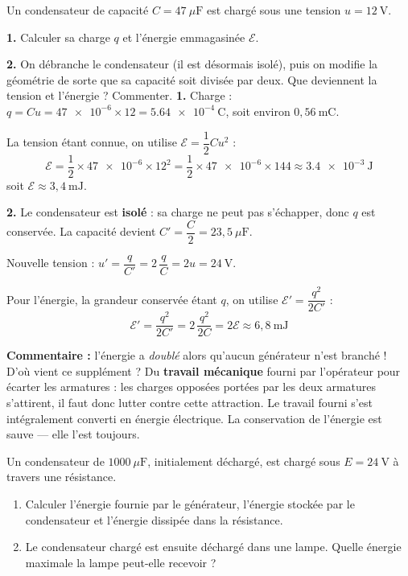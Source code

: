 \documentclass[11pt]{article}
\begin{document}
\begin{exoresolu}
Un condensateur de capacité $C = 47\ \mu\mathrm{F}$ est chargé sous une tension $u = 12\ \mathrm{V}$.

\textbf{1.} Calculer sa charge $q$ et l'énergie emmagasinée $\mathcal{E}$.

\textbf{2.} On débranche le condensateur (il est désormais isolé), puis on modifie la géométrie de sorte que sa capacité soit divisée par deux. Que deviennent la tension et l'énergie ? Commenter.
\tcblower
\textbf{1.} Charge : $q = Cu = \num{47e-6} \times 12 = \num{5,64e-4}\ \mathrm{C}$, soit environ $0{,}56\ \mathrm{mC}$.

La tension étant connue, on utilise $\mathcal{E} = \dfrac{1}{2}Cu^2$ :
\[ \mathcal{E} = \frac{1}{2} \times \num{47e-6} \times 12^2 = \frac{1}{2} \times \num{47e-6} \times 144 \approx \num{3,4e-3}\ \mathrm{J} \]
soit $\mathcal{E} \approx 3{,}4\ \mathrm{mJ}$.

\textbf{2.} Le condensateur est \textbf{isolé} : sa charge ne peut pas s'échapper, donc $q$ est conservée. La capacité devient $C' = \dfrac{C}{2} = 23{,}5\ \mu\mathrm{F}$.

Nouvelle tension : $u' = \dfrac{q}{C'} = 2\,\dfrac{q}{C} = 2u = 24\ \mathrm{V}$.

Pour l'énergie, la grandeur conservée étant $q$, on utilise $\mathcal{E}' = \dfrac{q^2}{2C'}$ :
\[ \mathcal{E}' = \frac{q^2}{2C'} = 2\,\frac{q^2}{2C} = 2\mathcal{E} \approx 6{,}8\ \mathrm{mJ} \]

\textbf{Commentaire :} l'énergie a \emph{doublé} alors qu'aucun générateur n'est branché ! D'où vient ce supplément ? Du \textbf{travail mécanique} fourni par l'opérateur pour écarter les armatures : les charges opposées portées par les deux armatures s'attirent, il faut donc lutter contre cette attraction. Le travail fourni s'est intégralement converti en énergie électrique. La conservation de l'énergie est sauve — elle l'est toujours.
\end{exoresolu}

\begin{exercice}
Un condensateur de $1000\ \mu\mathrm{F}$, initialement déchargé, est chargé sous $E = 24\ \mathrm{V}$ à travers une résistance.
\begin{enumerate}
\item Calculer l'énergie fournie par le générateur, l'énergie stockée par le condensateur et l'énergie dissipée dans la résistance.
\item Le condensateur chargé est ensuite déchargé dans une lampe. Quelle énergie maximale la lampe peut-elle recevoir ?
\end{enumerate}
\end{exercice}
\end{document}
